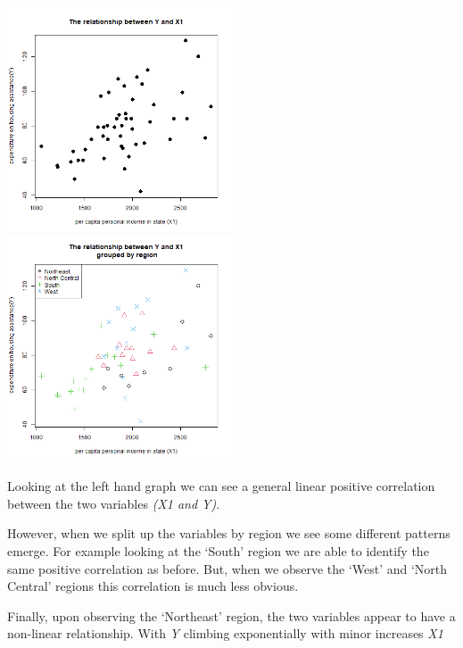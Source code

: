 \documentclass[12pt,letterpaper]{article}
\begin{document}
\begin{itemize}
\includegraphics[width=0.5\textwidth]{images/Y_against_X1.png}
\includegraphics[width=0.5\textwidth]{images/Y_against_X1_with_legend.png}


Looking at the left hand graph we can see a general linear positive correlation between the two variables \textit{(X1 and Y)}.

However, when we split up the variables by region we see some different patterns emerge. For example looking at the `South' region we are able to identify the same positive correlation as before. But, when we observe the `West' and `North Central' regions this correlation is much less obvious.

Finally, upon observing the `Northeast' region, the two variables appear to have a non-linear relationship. With \textit{Y} climbing exponentially with minor increases \textit{X1}
\end{itemize}
\end{document}
